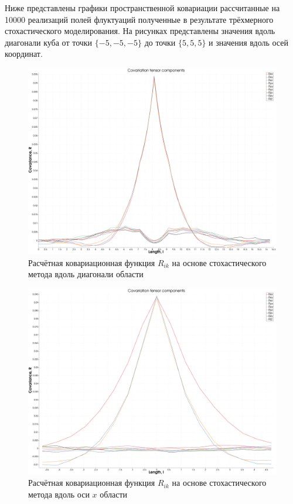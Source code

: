 Ниже представлены графики пространственной ковариации рассчитанные на 10000 реализаций полей флуктуаций полученные в результате трёхмерного стохастического моделирования. На рисунках представлены значения вдоль диагонали куба от точки $\{-5, -5, -5\}$ до точки $\{ 5, 5, 5 \}$ и значения вдоль осей координат.

%
%
\begin{figure}[ht] 
  \center
  \includegraphics [width=0.8\linewidth] {images/kriging/3components/calculated_all_diag.png}
  \caption{Расчётная ковариационная функция $R_{ik}$ на основе стохастического метода вдоль диагонали области } 
  \label{img:kriging_covariances_diag}  
\end{figure}

\begin{figure}[ht] 
  \center
  \includegraphics [width=0.8\linewidth] {images/kriging/3components/calculated_all_x.png}
  \caption{Расчётная ковариационная функция $R_{ik}$ на основе стохастического метода вдоль оси $x$ области } 
  \label{img:kriging_covariances_x}  
\end{figure}

